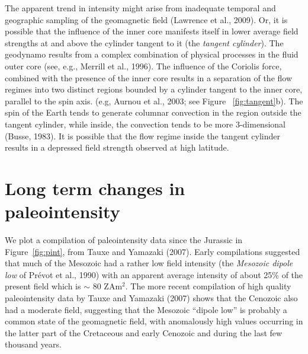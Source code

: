 The apparent trend in intensity might arise from inadequate temporal and geographic sampling of the geomagnetic field (Lawrence et al., 2009). Or,  it is possible that the influence of the  inner core manifests itself in lower average field strengths at and above the cylinder tangent to it (the
 {\it tangent cylinder}).  The geodynamo results from a  complex combination of
physical processes in the fluid outer core  (see, e.g.,
Merrill et \nocite{merrill96}
al., 1996).  The influence of the
Coriolis force, combined with the presence of the inner core results 
in a separation of the flow regimes into
two distinct regions bounded by  a cylinder tangent to the inner core, 
 parallel to the spin axis.  (e.g, 
 Aurnou et al., 2003; see Figure 
~\ref{fig:tangent}b). 	\nocite{aurnou03}   The spin of the Earth  tends to generate
columnar convection in the region outside the tangent cylinder, while 
inside,    the convection tends to be 
more 3-dimensional
(Busse, 1983).  \nocite{busse83}  It is possible that the flow regime inside the tangent cylinder results in a depressed field strength observed at high latitude.   












\section{Long term changes in paleointensity}

  We
plot  a compilation of paleointensity  data since the Jurassic in
Figure~\ref{fig:pint}, from Tauxe and Yamazaki (2007).  
Early compilations suggested that much of the Mesozoic  had a rather low field intensity (the 
{\it Mesozoic dipole low} of 
Pr\'evot et al., 1990) \nocite{prevot90}
 with an apparent average intensity of about 25\% of  the 
present field  which is $\sim$ 80  ZAm$^2$.  The more recent compilation of high
quality paleointensity data by 
Tauxe and Yamazaki (2007) shows that the Cenozoic
also had a moderate field, suggesting that the Mesozoic ``dipole
low'' is probably a common state of the geomagnetic field, with
anomalously high values occurring in the latter part of the Cretaceous and early
Cenozoic and during the last few thousand years.  



